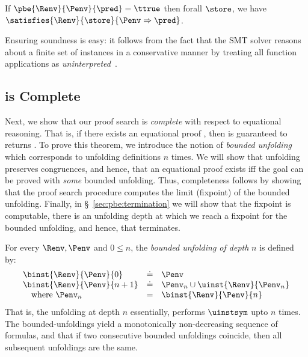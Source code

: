 \begin{theorem} \label{thm:pbe:sound}
If   $\pbe{\Renv}{\Penv}{\pred} = \ttrue$
then forall $\store$, we have $\satisfies{\Renv}{\store}{\Penv \Rightarrow \pred}$.
\end{theorem}

Ensuring soundness is easy: it follows from the fact
that the SMT solver reasons about a finite set of
instances in a conservative manner \ie by treating
all function applications as \emph{uninterpreted}~\cite{Nelson81}.
%

\subsection{\pbesym is Complete} \label{sec:pbe:semantics}

Next, we show that our proof search
is \emph{complete} with respect to
equational reasoning.
%
That is, if there exists an equational
proof
,
then
is guaranteed to returns \ttrue.
%
To prove this theorem, we introduce
the notion of \emph{bounded unfolding}
which corresponds to unfolding
definitions $n$ times.
%
We will show that unfolding preserves
congruences, and hence, that an equational
proof exists iff the goal can be proved with
\emph{some} bounded unfolding.
%
Thus, completeness follows by showing that
the proof search procedure computes the limit
(\ie fixpoint) of the bounded unfolding.
%
Finally, in \S~\ref{sec:pbe:termination}
we will show that the fixpoint is computable,
\ie there is an unfolding depth at which
we reach a fixpoint for the bounded unfolding,
and hence, that \pbesym terminates.

%
For every $\Renv, \Penv$ and $0 \leq n$,
the \emph{bounded unfolding of depth} $n$ is
defined by:
%
$$\begin{array}{lcl}
  \binst{\Renv}{\Penv}{0}     & \doteq & \Penv \\
  \binst{\Renv}{\Penv}{n+1}   & \doteq & \Penv_n \cup \uinst{\Renv}{\Penv_n} \\
  \quad \mbox{where}\ \Penv_n & =      & \binst{\Renv}{\Penv}{n}
\end{array}$$
%
That is, the unfolding at depth $n$ essentially,
performs $\uinstsym$ upto $n$ times.
%
The bounded-unfoldings yield a monotonically
non-decreasing sequence of formulas, and that
if two consecutive bounded unfoldings coincide,
then all subsequent unfoldings are the same.

